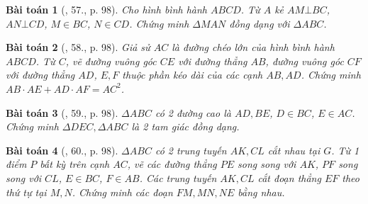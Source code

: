 \documentclass{article}
\newtheorem{baitoan}{Bài toán}
\begin{document}
\begin{baitoan}[\cite{SBT_Toan_8_tap_2}, 57., p. 98]
	Cho hình bình hành $ABCD$. Từ $A$ kẻ $AM\bot BC$, $AN\bot CD$, $M\in BC$, $N\in CD$. Chứng minh $\Delta MAN$ đồng dạng với $\Delta ABC$.
\end{baitoan}

\begin{baitoan}[\cite{SBT_Toan_8_tap_2}, 58., p. 98]
	Giả sử $AC$ là đường chéo lớn của hình bình hành $ABCD$. Từ $C$, vẽ đường vuông góc $CE$ với đường thẳng $AB$, đường vuông góc $CF$ với đường thẳng $AD$, $E,F$ thuộc phần kéo dài của các cạnh $AB,AD$. Chứng minh $AB\cdot AE + AD\cdot AF = AC^2$.
\end{baitoan}

\begin{baitoan}[\cite{SBT_Toan_8_tap_2}, 59., p. 98]
	$\Delta ABC$ có 2 đường cao là $AD,BE$, $D\in BC$, $E\in AC$. Chứng minh $\Delta DEC,\Delta ABC$ là 2 tam giác đồng dạng.
\end{baitoan}

\begin{baitoan}[\cite{SBT_Toan_8_tap_2}, 60., p. 98]
	$\Delta ABC$ có 2 trung tuyến $AK,CL$ cắt nhau tại $G$. Từ 1 điểm $P$ bất kỳ trên cạnh $AC$, vẽ các đường thẳng $PE$ song song với $AK$, $PF$ song song với $CL$, $E\in BC$, $F\in AB$. Các trung tuyến $AK,CL$ cắt đoạn thẳng $EF$ theo thứ tự tại $M,N$. Chứng minh các đoạn $FM,MN,NE$ bằng nhau.
\end{baitoan}


\printbibliography[heading=bibintoc]
	
\end{document}
